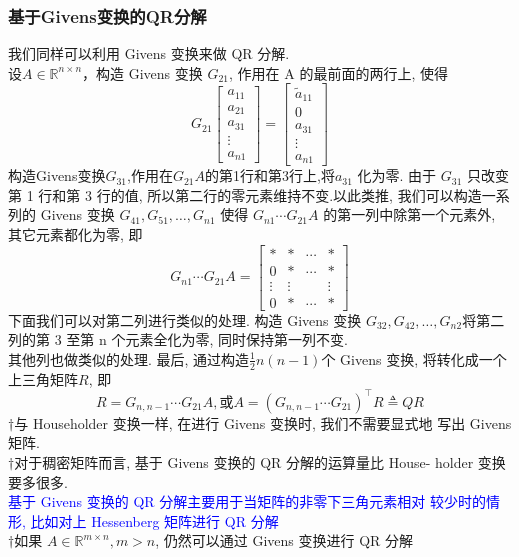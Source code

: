 \documentclass[12pt,a4paper]{article}
\begin{document}
\subsubsection{基于Givens变换的QR分解}
我们同样可以利用 Givens 变换来做 QR 分解.\\
设$A \in \mathbb{R}^{n \times n}$，构造 Givens 变换 $G_{21}$, 作用在 A 的最前面的两行上, 使得
$$
G_{21}\left[\begin{array}{c}{a_{11}} \\ {a_{21}} \\ {a_{31}} \\ {\vdots} \\ {a_{n 1}}\end{array}\right]=\left[\begin{array}{c}{\tilde{a}_{11}} \\ {0} \\ {a_{31}} \\ {\vdots} \\ {a_{n 1}}\end{array}\right]
$$
构造Givens变换$G_{31}$,作用在$G_{21}A$的第1行和第3行上,将$a_{31}$ 化为零. 由于 $G_{31}$ 只改变第 1 行和第 3 行的值, 所以第二行的零元素维持不变.以此类推, 我们可以构造一系列的 Givens 变换 $G_{41}, G_{51}, \ldots, G_{n 1}$ 使得 $G_{n 1} \cdots G_{21} A$ 的第一列中除第一个元素外, 其它元素都化为零, 即
$$
G_{n 1} \cdots G_{21} A=
\left[\begin{array}{cccc}
{*} & {*} & {\cdots} & {*} \\ 
{0} & {*} & {\cdots} & {*} \\ 
{\vdots} & {\vdots} & & {\vdots} \\ 
{0} & {*} & {\cdots} & {*}
\end{array}\right]
$$
下面我们可以对第二列进行类似的处理. 构造 Givens 变换 $G_{32}, G_{42}, \ldots, G_{n 2}$将第二列的第 3 至第 n 个元素全化为零, 同时保持第一列不变. \\
其他列也做类似的处理. 最后, 通过构造$\frac{1}{2} n(n-1)$个 Givens 变换, 将转化成一个上三角矩阵$R$, 即
$$
R=G_{n, n-1} \cdots G_{21} A,或A=\left(G_{n, n-1} \cdots G_{21}\right)^{\top} R \triangleq Q R
$$
$\dagger$与 Householder 变换一样, 在进行 Givens 变换时, 我们不需要显式地 写出 Givens 矩阵.\\
$\dagger$对于稠密矩阵而言, 基于 Givens 变换的 QR 分解的运算量比 House- holder 变换要多很多.\\
\textcolor{blue}{基于 Givens 变换的 QR 分解主要用于当矩阵的非零下三角元素相对 较少时的情形, 比如对上 Hessenberg 矩阵进行 QR 分解}\\
$\dagger$如果 $A \in \mathbb{R}^{m\times n}, m > n$, 仍然可以通过 Givens 变换进行 QR 分解\\
\end{document}

